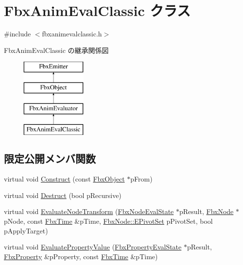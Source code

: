 \hypertarget{class_fbx_anim_eval_classic}{}\section{Fbx\+Anim\+Eval\+Classic クラス}
\label{class_fbx_anim_eval_classic}


{\ttfamily \#include $<$fbxanimevalclassic.\+h$>$}

Fbx\+Anim\+Eval\+Classic の継承関係図\begin{figure}[H]
\begin{center}
\leavevmode
\includegraphics[height=4.000000cm]{class_fbx_anim_eval_classic}
\end{center}
\end{figure}
\subsection*{限定公開メンバ関数}
\begin{DoxyCompactItemize}
\item 
virtual void \hyperlink{class_fbx_anim_eval_classic_a9b0ca916c170485271aa2ba23d38019a}{Construct} (const \hyperlink{class_fbx_object}{Fbx\+Object} $\ast$p\+From)
\item 
virtual void \hyperlink{class_fbx_anim_eval_classic_a308a42f3bd439a3e36f3b5171d5fc092}{Destruct} (bool p\+Recursive)
\item 
virtual void \hyperlink{class_fbx_anim_eval_classic_a83f7c6d89964e4ff48e7ad2d325a1eac}{Evaluate\+Node\+Transform} (\hyperlink{class_fbx_node_eval_state}{Fbx\+Node\+Eval\+State} $\ast$p\+Result, \hyperlink{class_fbx_node}{Fbx\+Node} $\ast$p\+Node, const \hyperlink{class_fbx_time}{Fbx\+Time} \&p\+Time, \hyperlink{class_fbx_node_ae62b7311ac4727654cdf1ebd5cbf7343}{Fbx\+Node\+::\+E\+Pivot\+Set} p\+Pivot\+Set, bool p\+Apply\+Target)
\item 
virtual void \hyperlink{class_fbx_anim_eval_classic_a3618b50c5fd35f18f5e6f873ca07cf2e}{Evaluate\+Property\+Value} (\hyperlink{class_fbx_property_eval_state}{Fbx\+Property\+Eval\+State} $\ast$p\+Result, \hyperlink{class_fbx_property}{Fbx\+Property} \&p\+Property, const \hyperlink{class_fbx_time}{Fbx\+Time} \&p\+Time)
\end{DoxyCompactItemize}
